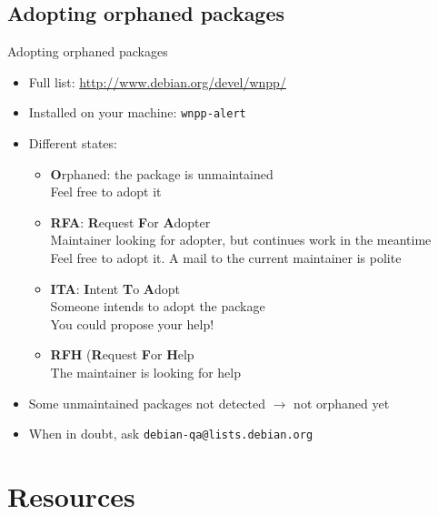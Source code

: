 \documentclass[10pt,final]{beamer}
\newcommand{\arr}{\textbf{$\rightarrow$}\xspace}
\begin{document}
\subsection{Adopting orphaned packages}
\begin{frame}{Adopting orphaned packages}
\begin{itemize}
	\item Full list: \url{http://www.debian.org/devel/wnpp/}
	\item Installed on your machine: \texttt{wnpp-alert}
	\item Different states:
	\begin{itemize}
		\item \textbf{O}rphaned: the package is unmaintained\\
			Feel free to adopt it
		\item \textbf{RFA}: \textbf{R}equest \textbf{F}or \textbf{A}dopter\\
			Maintainer looking for adopter, but continues work in the meantime\\
			Feel free to adopt it. A mail to the current maintainer is polite
		\item \textbf{ITA}: \textbf{I}ntent \textbf{T}o \textbf{A}dopt\\
			Someone intends to adopt the package\\
			You could propose your help!
		\item \textbf{RFH} (\textbf{R}equest \textbf{F}or \textbf{H}elp\\
			The maintainer is looking for help
	\end{itemize}
	\item Some unmaintained packages not detected \arr not orphaned yet
	\item When in doubt, ask \texttt{debian-qa@lists.debian.org}
	\end{itemize}
\end{frame}


\section{Resources}
\end{document}
